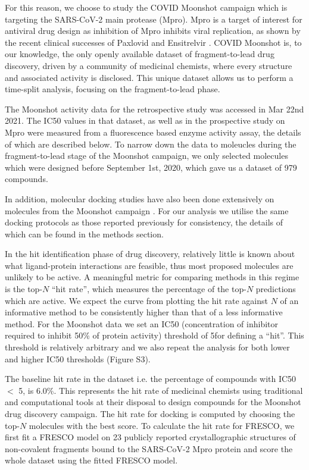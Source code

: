 For this reason, we choose to study the COVID Moonshot campaign \cite{Moonshot2022} which is targeting the SARS-CoV-2 main protease (Mpro). Mpro is a target of interest for antiviral drug design as inhibition of Mpro inhibits viral replication, as shown by the recent clinical successes of Paxlovid and Ensitrelvir \cite{Dafydd2021Paxlovid,unoh2022discovery}. COVID Moonshot is, to our knowledge, the only openly available dataset of fragment-to-lead drug discovery, driven by a community of medicinal chemists, where every structure and associated activity is disclosed. This unique dataset allows us to perform a time-split analysis, focusing on the fragment-to-lead phase.

The Moonshot activity data for the retrospective study was accessed in Mar 22nd 2021. The IC50 values in that dataset, as well as in the prospective study on Mpro were measured from a fluorescence based enzyme activity assay, the details of which are described below. To narrow down the data to moleucles during the fragment-to-lead stage of the Moonshot campaign, we only selected molecules which were designed before September 1st, 2020, which gave us a dataset of 979 compounds.

In addition, molecular docking studies have also been done extensively on molecules from the Moonshot campaign \cite{Morris2021Rank, Saar2021biorxiv}. For our analysis we utilise the same docking protocols as those reported previously for consistency, the details of which can be found in the methods section.

In the hit identification phase of drug discovery, relatively little is known about what ligand-protein interactions are feasible, thus most proposed molecules are unlikely to be active. A meaningful metric for comparing methods in this regime is the top-$N$ ``hit rate'', which measures the percentage of the top-$N$ predictions which are active. We expect the curve from plotting the hit rate against $N$ of an informative method to be consistently higher than that of a less informative method. For the Moonshot data we set an IC50 (concentration of inhibitor required to inhibit 50\% of protein activity) threshold of 5\uM for defining a ``hit''. This threshold is relatively arbitrary and we also repeat the analysis for both lower and higher IC50 thresholds (Figure S3).

The baseline hit rate in the dataset i.e. the percentage of compounds with IC50 $<$ 5\uM, is 6.0\%. This represents the hit rate of medicinal chemists using traditional and computational tools at their disposal to design compounds for the Moonshot drug discovery campaign. The hit rate for docking is computed by choosing the top-$N$ molecules with the best score. To calculate the hit rate for FRESCO, we first fit a FRESCO model on 23 publicly reported crystallographic structures of non-covalent fragments bound to the SARS-CoV-2 Mpro protein \cite{Douangamath2020XChem} and score the whole dataset using the fitted FRESCO model.

